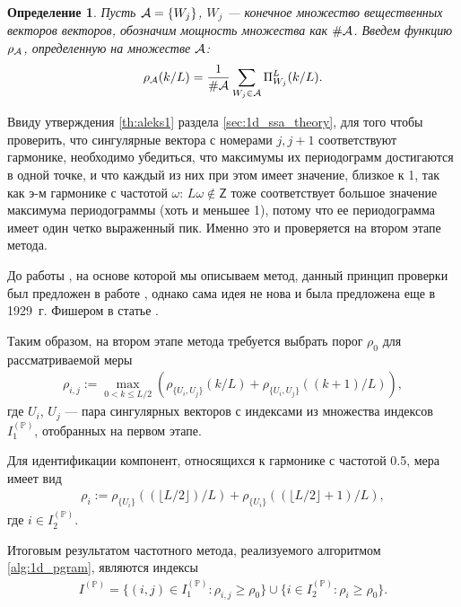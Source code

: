 \documentclass[specialist,
               substylefile = spbu.rtx,
               subf,href,colorlinks=true, 12pt]{disser}
\newtheorem{defn}{Определение}
\begin{document}
\begin{defn} \label{def:rho}
Пусть ${\cal{A}}= \{W_j\}$, $W_j$ --- конечное множество вещественных векторов  векторов, обозначим мощность множества как $\# {\cal{A}}$. Введем функцию $\rho_{\cal{A}}$, определенную на множестве ${\cal{A}}$:
\begin{gather*}
\rho_{{\cal{A}}}(k/L) = \frac{1}{\#{\cal{A}}} \sum_{W_j \in {\cal{A}}}{\Pi^{L}_{W_j}{(k/L)}}.
\end{gather*}
\end{defn}

Ввиду утверждения \ref{th:aleks1} раздела \ref{sec:1d_ssa_theory}, для того чтобы проверить, что сингулярные вектора с номерами $j, j + 1$ соответствуют гармонике, необходимо убедиться, что максимумы их периодограмм достигаются в одной точке, и что каждый из них при этом имеет значение, близкое к 1, так как э-м гармонике с частотой $\omega$: $L \omega \not \in \mathsf{Z}$ тоже соответствует большое значение максимума периодограммы (хоть и меньшее 1), потому что ее периодограмма имеет один четко выраженный пик.  Именно это и проверяется на втором этапе метода.

До работы \cite{Alexandrov2006}, на основе которой мы описываем метод, данный принцип проверки был предложен в работе \cite{Vautard1992}, однако сама идея не нова и была предложена еще в 1929~г. Фишером в статье \cite{Fisher1929}.

Таким образом, на втором этапе метода
 требуется выбрать порог $\rho_0$ для рассматриваемой меры
\begin{gather} \label{eq:rho_ij}
\rho_{i,j} := \max_{0 < k \leqslant L/2}{\left(\rho_{\{U_i,U_j\}}(k/L) + \rho_{\{U_i,U_j\}}((k+1)/L)\right)},
\end{gather}
где $U_i$, $U_j$ --- пара сингулярных векторов с индексами из множества индексов $I_1^{(\mathbb{P})}$, отобранных на первом этапе.

Для идентификации компонент, относящихся к гармонике с частотой 0.5, мера имеет вид
\begin{gather}\label{eq:rho_i}
\rho_{i} := \rho_{\{U_i\}}((\lfloor L/2 \rfloor)/L) + \rho_{\{U_i\}}((\lfloor L/2 \rfloor + 1)/L),
\end{gather}
где $i \in I_2^{(\mathbb{P})}$.

Итоговым результатом  частотного метода, реализуемого алгоритмом \ref{alg:1d_pgram}, являются индексы 
\begin{gather} \label{eq:pgram_I_p}
I^{(\mathbb{P})} = \{ (i,j) \in I_1^{(\mathbb{P})}: \rho_{i,j} \geqslant\rho_0 \} \cup \{ i \in I_2^{(\mathbb{P})}: \rho_{i} \geqslant\rho_0 \}.
\end{gather}
\end{document}
